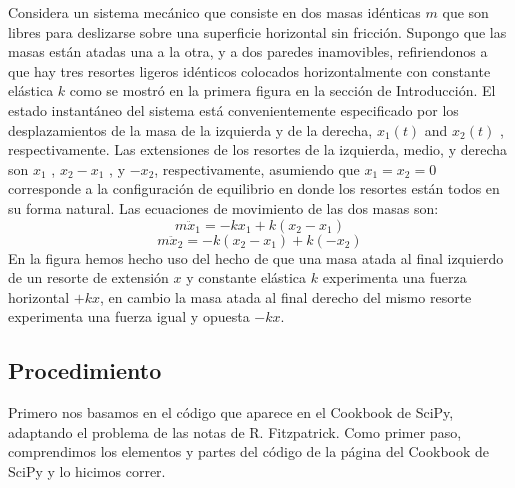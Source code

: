 \documentclass{article}
\begin{document}
Considera un sistema mecánico que consiste en dos masas idénticas $m$ que son libres para deslizarse sobre una superficie horizontal sin fricción. Supongo que las masas están atadas una a la otra, y a dos paredes inamovibles, refiriendonos a que hay tres resortes ligeros idénticos colocados horizontalmente con constante elástica $k$ como se mostró en la primera figura en la sección de Introducción. El estado instantáneo del sistema está convenientemente especificado por los desplazamientos de la masa de la izquierda y de la derecha, $ x_1(t)$ and $ x_2(t)$ , respectivamente. Las extensiones de los resortes de la izquierda, medio, y derecha son  $ x_1$ , $ x_2-x_1$ , y $ -x_2$, respectivamente, asumiendo que $ x_1=x_2=0$ corresponde a la configuración de equilibrio en donde los resortes están todos en su forma natural. Las ecuaciones de movimiento de las dos masas son:
\begin{equation}
    m \ddot{x}_1 = -k x_1 +k (x_2-x_1)
\end{equation}
\begin{equation}
        m \ddot{x}_2 = -k (x_2-x_1) + k (-x_2)
\end{equation}
En la figura hemos hecho uso del hecho de que una masa atada al final izquierdo de un resorte de extensión $x$ y constante elástica $k$ experimenta una fuerza horizontal $+k x$, en cambio la masa atada al final derecho del mismo resorte experimenta una fuerza igual y opuesta $-kx$.

\subsection{Procedimiento}
Primero nos basamos en el código que aparece en el Cookbook de SciPy, adaptando el problema de las notas de R. Fitzpatrick. Como primer paso, comprendimos los elementos y partes del código de la página del Cookbook de SciPy y lo hicimos correr.
\end{document}
